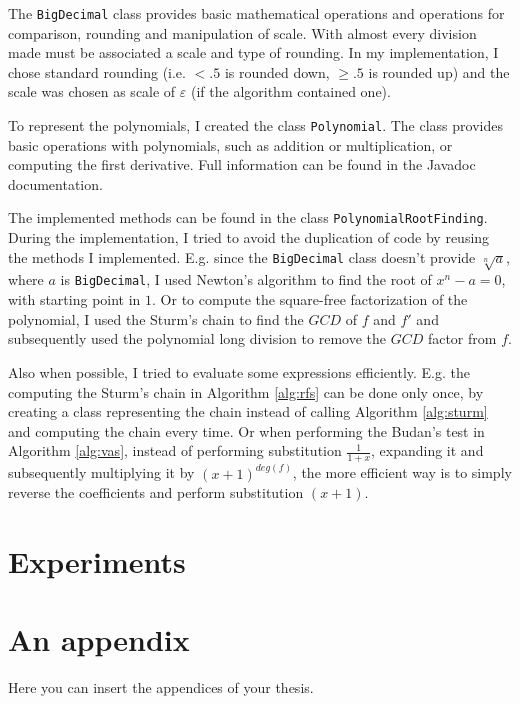 \documentclass[
  digital, %
  table,   %
  nolof,     %
  nolot,     %
	draft, %
]{fithesis3}
\begin{document}
The \texttt{BigDecimal} class provides basic mathematical operations and operations for comparison, rounding and manipulation of scale. With almost every division made must be associated a scale and type of rounding. In my implementation, I chose standard rounding (i.e. $<.5$ is rounded down, $\geq.5$ is rounded up) and the scale was chosen as scale of $\varepsilon$ (if the algorithm contained one).

To represent the polynomials, I created the class \texttt{Polynomial}. The class provides basic operations with polynomials, such as addition or multiplication, or computing the first derivative. Full information can be found in the Javadoc documentation.

The implemented methods can be found in the class \texttt{PolynomialRootFinding}. During the implementation, I tried to avoid the duplication of code by reusing the methods I implemented. E.g. since the \texttt{BigDecimal} class doesn't provide $\sqrt[n]{a}$, where $a$ is \texttt{BigDecimal}, I used Newton's algorithm to find the root of $x^{n}-a=0$, with starting point in $1$. Or to compute the square-free factorization of the polynomial, I used the Sturm's chain to find the $GCD$ of $f$ and $f'$ and subsequently used the polynomial long division to remove the $GCD$ factor from $f$.

Also when possible, I tried to evaluate some expressions efficiently. E.g. the computing the Sturm's chain in Algorithm \ref{alg:rfs} can be done only once, by creating a class representing the chain instead of calling Algorithm \ref{alg:sturm} and computing the chain every time. Or when performing the Budan's test in Algorithm \ref{alg:vas}, instead of performing substitution $\frac{1}{1+x}$, expanding it and subsequently multiplying it by $(x+1)^{deg(f)}$, the more efficient way is to simply reverse the coefficients and perform substitution $(x+1)$.

\chapter{Experiments}
\printbibliography[heading=bibintoc]


  \makeatletter\thesis@blocks@clear\makeatother
  \printindex

\appendix %
\chapter{An appendix}
Here you can insert the appendices of your thesis.
\end{document}
